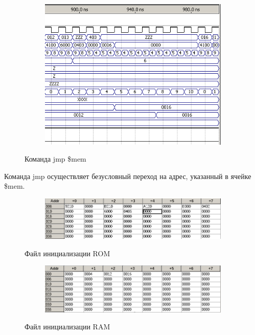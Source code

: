 \begin{figure}[ht]
\centering
  \begin{subfigure}[b]{\textwidth}
    \centering
    \includegraphics[scale=0.85]{pc_wave1_part5}
    \caption{}
  \end{subfigure}
    \caption{Команда jmp \$mem}
\end{figure}

Команда jmp осуществляет безусловный переход на адрес, указанный в ячейке \$mem.

\begin{figure}[ht]
\centering
  \begin{subfigure}[b]{\textwidth}
    \centering
    \includegraphics[scale=0.85]{rom1}
    \caption{}
  \end{subfigure}
    \caption{Файл инициализации ROM}
\end{figure}

\begin{figure}[ht]
\centering
  \begin{subfigure}[b]{\textwidth}
    \centering
    \includegraphics[scale=0.85]{ram1}
    \caption{}
  \end{subfigure}
    \caption{Файл инициализации RAM}
\end{figure}

